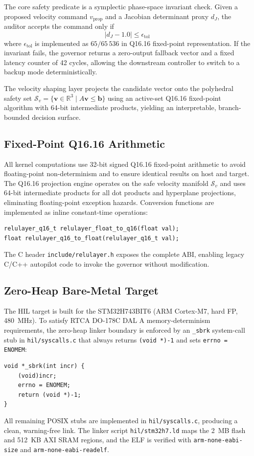 \documentclass[11pt,oneside]{article}
\begin{document}
The core safety predicate is a symplectic phase-space invariant check. Given a proposed velocity command $v_{\text{prop}}$ and a Jacobian determinant proxy $d_J$, the auditor accepts the command only if
\[
|d_J - 1.0| \le \epsilon_{\text{tol}}
\]
where $\epsilon_{\text{tol}}$ is implemented as $65/65\,536$ in Q16.16 fixed-point representation. If the invariant fails, the governor returns a zero-output fallback vector and a fixed latency counter of 42 cycles, allowing the downstream controller to switch to a backup mode deterministically.

The velocity shaping layer projects the candidate vector onto the polyhedral safety set $\mathcal{S}_v = \{ \mathbf{v} \in \mathbb{R}^3 \mid A \mathbf{v} \le \mathbf{b} \}$ using an active-set Q16.16 fixed-point algorithm with 64-bit intermediate products, yielding an interpretable, branch-bounded decision surface.

\subsection{Fixed-Point Q16.16 Arithmetic}

All kernel computations use 32-bit signed Q16.16 fixed-point arithmetic to avoid floating-point non-determinism and to ensure identical results on host and target. The Q16.16 projection engine operates on the safe velocity manifold $\mathcal{S}_v$ and uses 64-bit intermediate products for all dot products and hyperplane projections, eliminating floating-point exception hazards. Conversion functions are implemented as inline constant-time operations:
\begin{lstlisting}
relulayer_q16_t relulayer_float_to_q16(float val);
float relulayer_q16_to_float(relulayer_q16_t val);
\end{lstlisting}
The C header \texttt{include/relulayer.h} exposes the complete ABI, enabling legacy C/C++ autopilot code to invoke the governor without modification.

\subsection{Zero-Heap Bare-Metal Target}

The HIL target is built for the STM32H743BIT6 (ARM Cortex-M7, hard FP, 480~MHz). To satisfy RTCA DO-178C DAL A memory-determinism requirements, the zero-heap linker boundary is enforced by an \texttt{\_sbrk} system-call stub in \texttt{hil/syscalls.c} that always returns \texttt{(void *)-1} and sets \texttt{errno = ENOMEM}:
\begin{lstlisting}
void *_sbrk(int incr) {
    (void)incr;
    errno = ENOMEM;
    return (void *)-1;
}
\end{lstlisting}
All remaining POSIX stubs are implemented in \texttt{hil/syscalls.c}, producing a clean, warning-free link. The linker script \texttt{hil/stm32h7.ld} maps the 2~MB flash and 512~KB AXI SRAM regions, and the ELF is verified with \texttt{arm-none-eabi-size} and \texttt{arm-none-eabi-readelf}.
\end{document}
